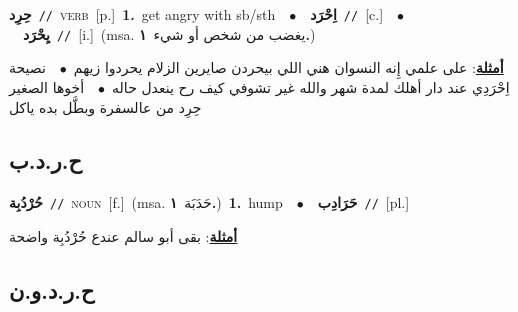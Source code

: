 \documentclass[10pt,a4paper,twoside]{article} %
\begin{document}
\begin{multicols}{2}
{\setlength\topsep{0pt}\textbf{\foreignlanguage{arabic}{حِرِد}}\ {\color{gray}\texttt{//}\color{black}}\ \textsc{verb}\ [p.]\ \textbf{1.}~get angry with sb/sth\ \ $\bullet$\ \ \setlength\topsep{0pt}\textbf{\foreignlanguage{arabic}{اِحْرَد}}\ {\color{gray}\texttt{//}\color{black}}\ [c.]\ \ $\bullet$\ \ \setlength\topsep{0pt}\textbf{\foreignlanguage{arabic}{يِحْرَد}}\ {\color{gray}\texttt{//}\color{black}}\ [i.]\ \color{gray}(msa. \foreignlanguage{arabic}{يغضب من شخص أو شيء}~\foreignlanguage{arabic}{\textbf{١.}})\color{black}\  \begin{flushright}\color{gray}\foreignlanguage{arabic}{\textbf{\underline{\foreignlanguage{arabic}{أمثلة}}}: على علمي إِنه النسوان هني اللي بيحردن صايرين الزلام يحردوا زيهم\ $\bullet$\ \  نصيحة اِحْرَدِي عند دار أهلك لمدة شهر والله غير تشوفي كيف رح ينعدل حاله\ $\bullet$\ \  أخوها الصغير حِرِد من عالسفرة وبطَّل بده ياكل}\end{flushright}\color{black}} \vspace{2mm}

\vspace{-3mm}
\subsection*{\color{blue}\foreignlanguage{arabic}{ح.ر.د.ب}\color{blue}{}} 

{\setlength\topsep{0pt}\textbf{\foreignlanguage{arabic}{حُرْدُبِة}}\ {\color{gray}\texttt{//}\color{black}}\ \textsc{noun}\ [f.]\ \color{gray}(msa. \foreignlanguage{arabic}{حَدَبَة}~\foreignlanguage{arabic}{\textbf{١.}})\color{black}\ \textbf{1.}~hump\ \ $\bullet$\ \ \setlength\topsep{0pt}\textbf{\foreignlanguage{arabic}{حَرَادِب}}\ {\color{gray}\texttt{//}\color{black}}\ [pl.]\  \begin{flushright}\color{gray}\foreignlanguage{arabic}{\textbf{\underline{\foreignlanguage{arabic}{أمثلة}}}: بقى أبو سالم عندع حُرْدُبِة واضحة}\end{flushright}\color{black}} \vspace{2mm}

\vspace{-3mm}
\subsection*{\color{blue}\foreignlanguage{arabic}{ح.ر.د.و.ن}\color{blue}{ (ntws)}} 


\end{multicols}
\end{document}
